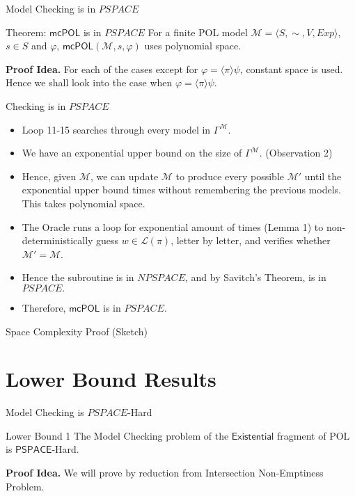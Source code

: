\documentclass{beamer}
\newcommand\ldiaarg[1]{\langle#1\rangle}
\newcommand{\M}{\mathcal{M}}
\newcommand{\LL}{\mathcal{L}} %
\newcommand{\DecidePSPACE}{\mathsf{mcPOL}}
\newcommand{\existential}{\mathsf{Existential}}
\newcommand{\PSPACE}{\mathsf{PSPACE}}
\begin{document}
\begin{frame}{Model Checking is in $PSPACE$}
    \begin{block}{Theorem: $\DecidePSPACE$ is in $PSPACE$}
    For a finite POL model $\M = \ldiaarg{S,\sim,V,Exp}$, $s\in S$ and $\varphi$, $\DecidePSPACE(\M,s,\varphi)$ uses polynomial space.
    \end{block}
    \textbf{Proof Idea. } For each of the cases except for $\varphi = \ldiaarg{\pi}\psi$, constant space is used.\\
    Hence we shall look into the case when $\varphi = \ldiaarg{\pi}\psi$. 
\end{frame}

\begin{frame}{Checking is in $PSPACE$}
    \begin{itemize}
        \item<1-> Loop 11-15 searches through every model in $\Gamma^\M$.
        \item<2-> We have an exponential upper bound on the size of $\Gamma^\M$. (Observation 2) 
        \item<3-> Hence, given $\M$, we can update $\M$ to produce every possible $\M'$ until the exponential upper bound times without remembering the previous models. This takes polynomial space.
        \item<4-> The Oracle runs a loop for exponential amount of times (Lemma 1) to non-deterministically guess $w\in\LL(\pi)$, letter by letter, and verifies whether $\M' = \M$.
        \item<5-> Hence the subroutine is in $NPSPACE$, and by Savitch's Theorem, is in $PSPACE.$
        \item<6-> Therefore, $\DecidePSPACE$ is in $PSPACE$.
    \end{itemize}
\end{frame}

\begin{frame}{Space Complexity Proof (Sketch)}
    
\end{frame}

\section{Lower Bound Results}

\begin{frame}{Model Checking is $PSPACE$-Hard}
    \begin{block}{Lower Bound 1}
    The Model Checking problem of the $\existential$ fragment of POL is $\PSPACE$-Hard.
    \end{block}\pause
    \textbf{Proof Idea. } We will prove by reduction from Intersection Non-Emptiness Problem.
\end{frame}
\end{document}
